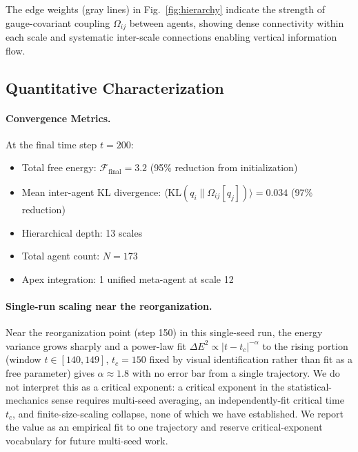 \documentclass[11pt]{article}
\begin{document}
The edge weights (gray lines) in Fig.~\ref{fig:hierarchy} indicate the strength of gauge-covariant coupling $\Omega_{ij}$ between agents, showing dense connectivity within each scale and systematic inter-scale connections enabling vertical information flow.

\subsection{Quantitative Characterization}

\paragraph{Convergence Metrics.}
At the final time step $t = 200$:
\begin{itemize}
\item Total free energy: $\mathcal{F}_{\text{final}} = 3.2$ (95\% reduction from initialization)
\item Mean inter-agent KL divergence: $\langle\mathrm{KL}(q_i\|\Omega_{ij}[q_j])\rangle = 0.034$ (97\% reduction)
\item Hierarchical depth: 13 scales
\item Total agent count: $N = 173$
\item Apex integration: 1 unified meta-agent at scale 12
\end{itemize}

\paragraph{Single-run scaling near the reorganization.}
Near the reorganization point (step 150) in this single-seed run, the energy variance grows sharply and a power-law fit $\Delta E^2 \propto |t - t_c|^{-\alpha}$ to the rising portion (window $t \in [140, 149]$, $t_c = 150$ fixed by visual identification rather than fit as a free parameter) gives $\alpha \approx 1.8$ with no error bar from a single trajectory. We do not interpret this as a critical exponent: a critical exponent in the statistical-mechanics sense requires multi-seed averaging, an independently-fit critical time $t_c$, and finite-size-scaling collapse, none of which we have established. We report the value as an empirical fit to one trajectory and reserve critical-exponent vocabulary for future multi-seed work.
\end{document}

